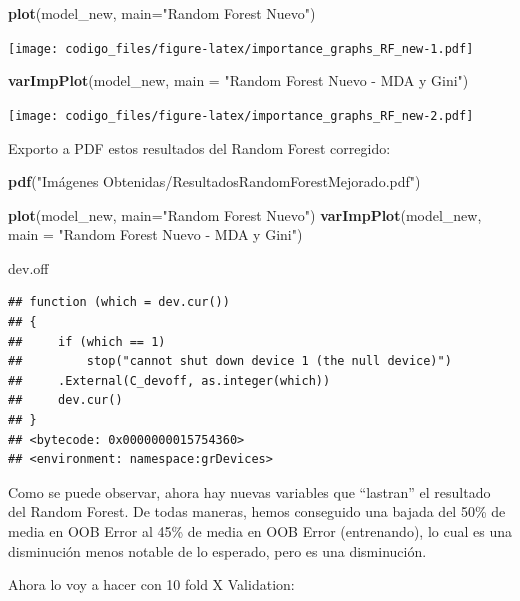 \documentclass[]{article}
\newenvironment{Shaded}{\begin{snugshade}}{\end{snugshade}}
\newcommand{\KeywordTok}[1]{\textcolor[rgb]{0.13,0.29,0.53}{\textbf{#1}}}
\newcommand{\DataTypeTok}[1]{\textcolor[rgb]{0.13,0.29,0.53}{#1}}
\newcommand{\StringTok}[1]{\textcolor[rgb]{0.31,0.60,0.02}{#1}}
\newcommand{\NormalTok}[1]{#1}
\begin{document}
\begin{Shaded}
\begin{Highlighting}[]
\KeywordTok{plot}\NormalTok{(model_new, }\DataTypeTok{main=}\StringTok{"Random Forest Nuevo"}\NormalTok{)}
\end{Highlighting}
\end{Shaded}

\texttt{[image: codigo\_files/figure-latex/importance\_graphs\_RF\_new-1.pdf]}

\begin{Shaded}
\begin{Highlighting}[]
\KeywordTok{varImpPlot}\NormalTok{(model_new, }\DataTypeTok{main =} \StringTok{"Random Forest Nuevo - MDA y Gini"}\NormalTok{) }
\end{Highlighting}
\end{Shaded}

\texttt{[image: codigo\_files/figure-latex/importance\_graphs\_RF\_new-2.pdf]}

Exporto a PDF estos resultados del Random Forest corregido:

\begin{Shaded}
\begin{Highlighting}[]
\KeywordTok{pdf}\NormalTok{(}\StringTok{"Imágenes Obtenidas/ResultadosRandomForestMejorado.pdf"}\NormalTok{)}

\KeywordTok{plot}\NormalTok{(model_new, }\DataTypeTok{main=}\StringTok{"Random Forest Nuevo"}\NormalTok{)}
\KeywordTok{varImpPlot}\NormalTok{(model_new, }\DataTypeTok{main =} \StringTok{"Random Forest Nuevo - MDA y Gini"}\NormalTok{) }

\NormalTok{dev.off}
\end{Highlighting}
\end{Shaded}

\begin{verbatim}
## function (which = dev.cur()) 
## {
##     if (which == 1) 
##         stop("cannot shut down device 1 (the null device)")
##     .External(C_devoff, as.integer(which))
##     dev.cur()
## }
## <bytecode: 0x0000000015754360>
## <environment: namespace:grDevices>
\end{verbatim}

Como se puede observar, ahora hay nuevas variables que ``lastran'' el
resultado del Random Forest. De todas maneras, hemos conseguido una
bajada del 50\% de media en OOB Error al 45\% de media en OOB Error
(entrenando), lo cual es una disminución menos notable de lo esperado,
pero es una disminución.

Ahora lo voy a hacer con 10 fold X Validation:
\end{document}
